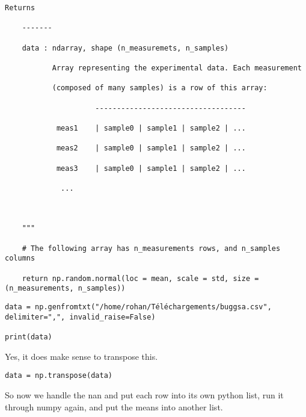 \documentclass[12pt]{article}
\begin{document}
\begin{lstlisting}[frame=shadowbox]
    Returns

    -------

    data : ndarray, shape (n_measuremets, n_samples)

           Array representing the experimental data. Each measurement 

           (composed of many samples) is a row of this array:

                     -----------------------------------

            meas1    | sample0 | sample1 | sample2 | ...

            meas2    | sample0 | sample1 | sample2 | ...

            meas3    | sample0 | sample1 | sample2 | ...

             ...



    """

    # The following array has n_measurements rows, and n_samples columns

    return np.random.normal(loc = mean, scale = std, size = (n_measurements, n_samples))
\end{lstlisting}


\begin{lstlisting}[frame=shadowbox]
data = np.genfromtxt("/home/rohan/Téléchargements/buggsa.csv", delimiter=",", invalid_raise=False)

print(data)
\end{lstlisting}


Yes, it does make sense to transpose this.


\begin{lstlisting}[frame=shadowbox]
data = np.transpose(data)
\end{lstlisting}


So now we handle the nan and put each row into its own python list, run it through numpy again, and put the means into another list.
\end{document}
